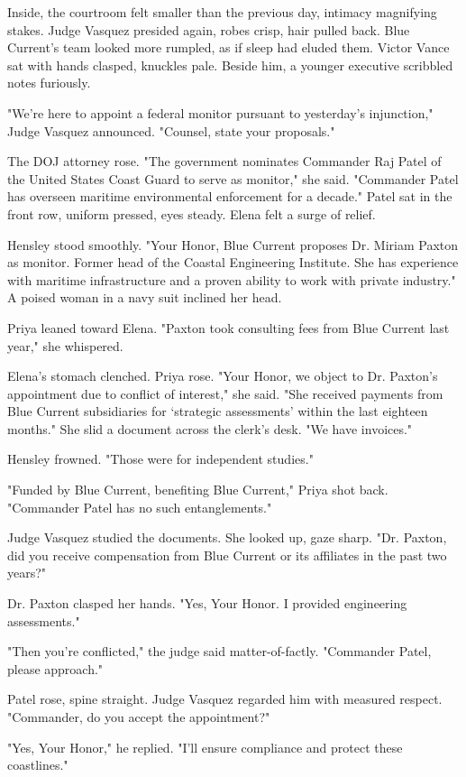 Inside, the courtroom felt smaller than the previous day, intimacy magnifying stakes. Judge Vasquez presided again, robes crisp, hair pulled back. Blue Current's team looked more rumpled, as if sleep had eluded them. Victor Vance sat with hands clasped, knuckles pale. Beside him, a younger executive scribbled notes furiously.

"We're here to appoint a federal monitor pursuant to yesterday's injunction," Judge Vasquez announced. "Counsel, state your proposals."

The DOJ attorney rose. "The government nominates Commander Raj Patel of the United States Coast Guard to serve as monitor," she said. "Commander Patel has overseen maritime environmental enforcement for a decade." Patel sat in the front row, uniform pressed, eyes steady. Elena felt a surge of relief.

Hensley stood smoothly. "Your Honor, Blue Current proposes Dr. Miriam Paxton as monitor. Former head of the Coastal Engineering Institute. She has experience with maritime infrastructure and a proven ability to work with private industry." A poised woman in a navy suit inclined her head.

Priya leaned toward Elena. "Paxton took consulting fees from Blue Current last year," she whispered.

Elena's stomach clenched. Priya rose. "Your Honor, we object to Dr. Paxton's appointment due to conflict of interest," she said. "She received payments from Blue Current subsidiaries for `strategic assessments' within the last eighteen months." She slid a document across the clerk's desk. "We have invoices."

Hensley frowned. "Those were for independent studies."

"Funded by Blue Current, benefiting Blue Current," Priya shot back. "Commander Patel has no such entanglements."

Judge Vasquez studied the documents. She looked up, gaze sharp. "Dr. Paxton, did you receive compensation from Blue Current or its affiliates in the past two years?"

Dr. Paxton clasped her hands. "Yes, Your Honor. I provided engineering assessments."

"Then you're conflicted," the judge said matter-of-factly. "Commander Patel, please approach."

Patel rose, spine straight. Judge Vasquez regarded him with measured respect. "Commander, do you accept the appointment?"

"Yes, Your Honor," he replied. "I'll ensure compliance and protect these coastlines."

